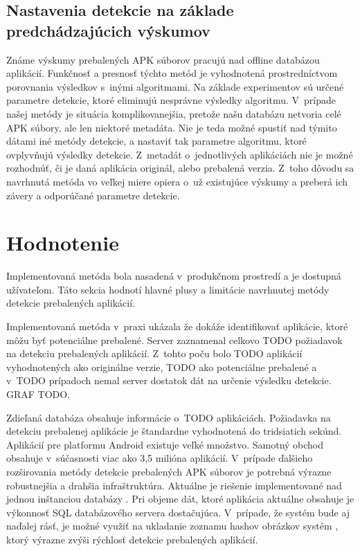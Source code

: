 \subsection*{Nastavenia detekcie na základe predchádzajúcich výskumov}
Známe výskumy prebalených APK súborov pracujú nad offline databázou aplikácií. Funkčnosť a presnosť týchto metód je vyhodnotená prostredníctvom porovnania výsledkov s~inými algoritmami. Na základe experimentov sú určené parametre detekcie, ktoré eliminujú nesprávne výsledky algoritmu. V~prípade našej metódy je situácia komplikovanejšia, pretože našu databázu netvoria celé APK súbory, ale len niektoré metadáta. Nie je teda možné spustiť nad týmito dátami iné metódy detekcie, a nastaviť tak parametre algoritmu, ktoré ovplyvňujú výsledky detekcie. Z~metadát o~jednotlivých aplikáciách nie je možné rozhodnúť, či je daná aplikácia originál, alebo prebalená verzia.  Z~toho dôvodu sa navrhnutá metóda vo veľkej miere opiera o~už existujúce výskumy a preberá ich závery a odporúčané parametre detekcie. 

\section{Hodnotenie}
\label{sec:hodnotenie}
Implementovaná metóda bola nasadená v~produkčnom prostredí a je dostupná užívateľom. Táto sekcia hodnotí hlavné plusy a limitácie navrhnutej metódy detekcie prebalených aplikácií.

Implementovaná metóda v~praxi ukázala že dokáže identifikovať aplikácie, ktoré môžu byť potenciálne prebalené. Server zaznamenal celkovo TODO požiadavok na detekciu prebalených aplikácií. Z~tohto poču bolo TODO aplikácií vyhodnotených ako originálne verzie, TODO ako potenciálne prebalené a v~TODO prípadoch nemal server dostatok dát na určenie výsledku detekcie. GRAF TODO.

Zdieľaná databáza obsahuje informácie o~TODO aplikáciách. Požiadavka na detekciu prebalenej aplikácie je štandardne vyhodnotená do tridsiatich sekúnd. Aplikácií pre platformu Android existuje veľké množstvo. Samotný obchod  obsahuje v~súčasnosti viac ako 3,5 milióna aplikácií. V~prípade ďalšieho rozširovania metódy detekcie prebalených APK súborov  je potrebná výrazne robustnejšia a drahšia infraštruktúra. Aktuálne je riešenie implementované nad jednou inštanciou databázy . Pri objeme dát, ktoré aplikácia aktuálne obsahuje je výkonnosť SQL databázového servera dostačujúca. V~prípade, že systém bude aj naďalej rásť, je možné využiť na ukladanie zoznamu hashov obrázkov systém , ktorý výrazne zvýši rýchlosť detekcie prebalených aplikácií. 

